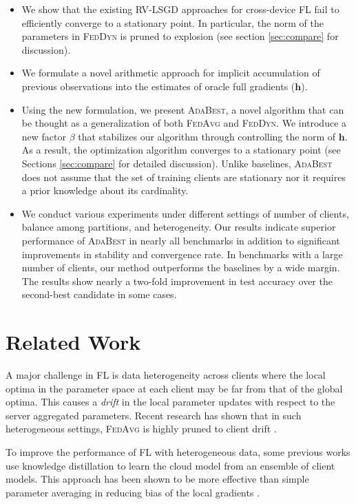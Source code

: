 \documentclass[runningheads]{llncs}
\def\vh{{\bm{h}}}
\newcommand{\fedavg}{\textsc{FedAvg}\xspace}
\newcommand{\feddyn}{\textsc{FedDyn}\xspace}
\newcommand{\ours}{\textsc{AdaBest}\xspace}
\newcommand{\rvlsgd}{\textsc{RV-LSGD}\xspace}
\begin{document}
\begin{itemize}
    \item We show that the existing \rvlsgd approaches for cross-device FL fail to efficiently converge to a stationary point. In particular, the norm of the parameters in \feddyn is pruned to explosion (see section \ref{sec:compare} for discussion).
    \item We formulate a novel arithmetic approach for implicit accumulation of previous observations into the estimates of oracle full gradients ($\vh$).
    \item Using the new formulation, we present \ours, a novel algorithm that can be thought as a generalization of both \fedavg and \feddyn. We introduce a new factor $\beta$ that stabilizes our algorithm through controlling the norm of $\vh$. As a result, the optimization algorithm converges to a stationary point (see Sections \ref{sec:compare} for detailed discussion). Unlike baselines, \ours does not assume that the set of training clients are stationary nor it requires a prior knowledge about its cardinality.
    \item We conduct various experiments under different settings of number of clients, balance among partitions, and heterogeneity. 
    Our results indicate superior performance of \ours in nearly all benchmarks 
in addition to significant improvements in stability and convergence rate. 
    In benchmarks with a large number of clients, our method outperforms the baselines by a wide margin. 
    The results show nearly a two-fold improvement in test accuracy over the second-best candidate in some cases.
\end{itemize}



\section{Related Work}
\label{subsec:related}

A major challenge in FL is data heterogeneity across clients where the local optima in the parameter space at each client may be far from that of the global optima. This causes a {\it drift} in the local parameter updates with respect to the server aggregated parameters. Recent research has shown that in such heterogeneous settings, \fedavg is highly pruned to client drift \cite{zhao2018federated}. 

To improve the performance of FL with heterogeneous data, some previous works use knowledge distillation to learn the cloud model from an ensemble of client models. This approach has been shown to be more effective than simple parameter averaging in reducing bias of the local gradients \cite{lin2020ensemble,li2019fedmd,zhu2021data}.
\end{document}
